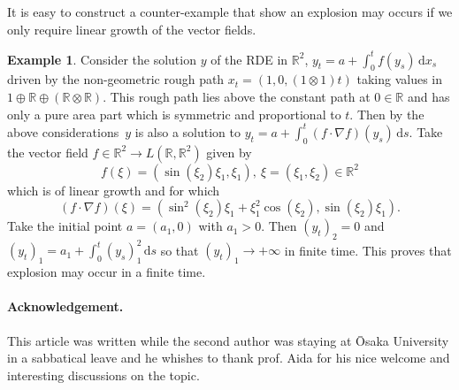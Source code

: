\documentclass[a4paper,12pt]{article}
\theoremstyle{definition}
\newtheorem{example}[theorem]{Example}
\newcommand{\vd}{\,\mathrm{d}}
\newcommand{\RR}{\mathbb{R}}
\begin{document}
It is easy to construct a counter-example that show an explosion may occurs if we only require  linear growth of the vector fields.
\begin{example}
Consider the solution $y$ of the RDE in $\RR^2$,  $y_t=a+\int_0^t f(y_s)\vd x_s$  driven by the non-geometric  rough path
 $x_t=(1,0,(1\otimes 1)t)$  taking values in $1\oplus \RR \oplus (\RR \otimes \RR)$. This rough path lies above  the constant path at $0\in\RR$ and has only a pure area part which is symmetric and proportional to $t$.
Then by the above considerations~$y$ is also a solution to 
$y_t=a+\int_0^t (f \cdot \nabla f)(y_s)\vd s$.
Take the vector field $f\in \RR^2\to L(\RR,\RR^2)$ given by
$$
f(\xi)=(\sin(\xi_2) \xi_1,\xi_1 ), \ \xi=(\xi_1,\xi_2)\in\RR^2
$$
which is of linear growth and for which
$$
(f \cdot \nabla f)(\xi) = (\sin^2(\xi_2) \xi_1+\xi_1^2 \cos(\xi_2), \sin(\xi_2) \xi_1) .
$$
Take the initial point $a=(a_1,0)$ with $a_1>0$. Then $(y_t)_2=0$ and 
$
(y_t)_1 = a_1 +\int_0^t (y_s)_1^2 \vd s
$
so that $(y_t)_1\to+\infty$ in finite time. This proves that explosion may
occur in a finite time.
\end{example}

\paragraph*{Acknowledgement.} This article was written while the second author
was staying at \=Osaka University in a sabbatical leave and he whishes to thank prof. Aida
for his nice welcome and interesting discussions on the topic.
\end{document}
